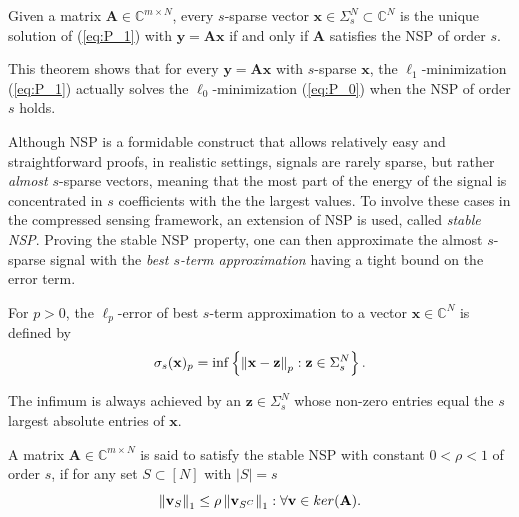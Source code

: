 \begin{theorem}
Given a matrix $\mathbf{A} \in \mathbb{C}^{m \times N}$, every $s$-sparse vector $\mathbf{x} \in \Sigma_s^N \subset \mathbb{C}^N$ is the unique solution of (\ref{eq:P_1}) with $\mathbf{y} = \mathbf{Ax}$ if and only if $\mathbf{A}$ satisfies the NSP of order $s$.
\end{theorem}

\begin{remark}
This theorem shows that for every $\mathbf{y} = \mathbf{Ax}$ with $s$-sparse $\mathbf{x}$, the $\ell_1$-minimization (\ref{eq:P_1}) actually solves the $\ell_0$-minimization (\ref{eq:P_0}) when the NSP of order $s$ holds.
\end{remark}

Although NSP is a formidable construct that allows relatively easy and straightforward proofs, in realistic settings, signals are rarely sparse, but rather \textit{almost} $s$-sparse vectors, meaning that the most part of the energy of the signal is concentrated in $s$ coefficients with the the largest values. To involve these cases in the compressed sensing framework, an extension of NSP is used, called \textit{stable NSP}. Proving the stable NSP property, one can then approximate the almost $s$-sparse signal with the \textit{best $s$-term approximation} having a tight bound on the error term.

\begin{definition}
For $p > 0$, the $\ell_p$-error of best $s$-term approximation to a vector $\mathbf{x} \in \mathbb{C}^N$ is defined by
\[\sigma_s(\mathbf{x})_p = \inf\left\{\left\lVert\mathbf{x} - \mathbf{z}\right\rVert_p : \mathbf{z} \in \Sigma_s^N\right\}.\]
\end{definition}

\begin{remark}
The  infimum is always achieved by an $\mathbf{z} \in \Sigma_s^N$ whose non-zero entries equal the $s$ largest absolute entries of $\mathbf{x}$.
\end{remark}

\begin{definition}
A matrix $\mathbf{A} \in \mathbb{C}^{m \times N}$ is said to satisfy the stable NSP with constant $0 < \rho < 1$ of order $s$, if for any set $S \subset [N]$ with $|S| = s$
\[\left\lVert\mathbf{v}_S\right\rVert_1 \le \rho \left\lVert\mathbf{v}_{S^C}\right\rVert_1 : \forall \mathbf{v} \in ker(\mathbf{A}).\]
\end{definition}

